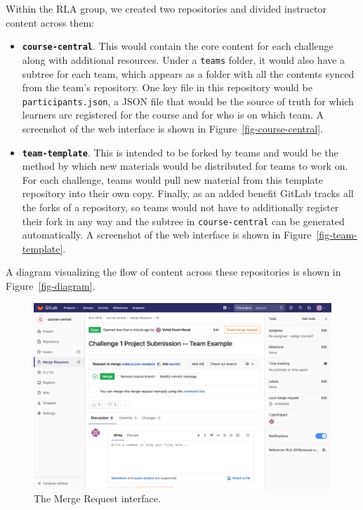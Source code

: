 \documentclass[12pt,twoside]{mitthesis}
\begin{document}
{Within the RLA group, we created two repositories and divided instructor content across them:
\begin{itemize}
	\item \textbf{\texttt{course-central}}. This would contain the core content for each challenge along with additional resources. Under a \texttt{teams} folder, it would also have a subtree for each team, which appears as a folder with all the contents synced from the team's repository. One key file in this repository would be \texttt{participants.json}, a JSON file that would be the source of truth for which learners are registered for the course and for who is on which team. A screenshot of the web interface is shown in Figure~\ref{fig-course-central}.
	\item \textbf{\texttt{team-template}}. This is intended to be forked by teams and would be the method by which new materials would be distributed for teams to work on. For each challenge, teams would pull new material from this template repository into their own copy. Finally, as an added benefit GitLab tracks all the forks of a repository, so teams would not have to additionally register their fork in any way and the subtree in \texttt{course-central} can be generated automatically. A screenshot of the web interface is shown in Figure~\ref{fig-team-template}.
\end{itemize}
A diagram visualizing the flow of content across these repositories is shown in Figure~\ref{fig-diagram}.
}

\begin{figure}[H]
\centering
\includegraphics[scale=0.3]{fig-merge-request.png}
\caption{\label{fig-merge-request} The Merge Request interface.}
\end{figure}
\end{document}
